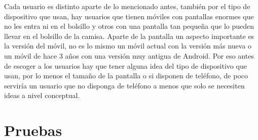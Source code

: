 Cada usuario es distinto aparte de lo mencionado antes, también por el tipo de dispositivo que usan, hay usuarios que tienen móviles con pantallas enormes que no les entra ni en el bolsillo y otros con una pantalla tan pequeña que lo pueden llevar en el bolsillo de la camisa.
Aparte de la pantalla un aspecto importante es la versión del móvil, no es lo mismo un móvil actual con la versión más nueva o un móvil de hace 3 años con una versión muy antigua de Android.
Por eso antes de escoger a los usuarios hay que tener alguna idea del tipo de dispositivo que usan, por lo menos el tamaño de la pantalla o si disponen de teléfono, de poco serviría un usuario que no disponga de teléfono a menos que solo se necesiten ideas a nivel conceptual.



\section{Pruebas}
\label{secc:pruebas}

